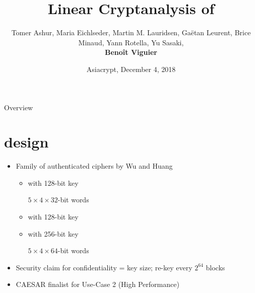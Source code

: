 \documentclass[aspectratio=169,10pt,webfont]{beamer}
\title{Linear Cryptanalysis of \MORUS}
\author{Tomer Ashur, Maria Eichlseder, Martin M. Lauridsen, Ga\"etan Leurent, Brice Minaud, Yann Rotella, Yu Sasaki,\\ \textbf{Beno\^it Viguier}}
\date[Short Occasion]{Asiacrypt, December 4, 2018}
\begin{document}
\begin{frame}
  \titlepage
\end{frame}


\begin{frame}{\itemwrap{\faMapSigns} Overview}
  \tableofcontents
\end{frame}

\section{\emph{\itemwrap{\faCogs}} \MORUS design}


\begin{frame}{\MORUS}

  \begin{itemize}
    \item Family of authenticated ciphers by Wu and Huang %
      \begin{itemize}
        \item \MORUS[640] with 128-bit key

          \hfill
          $5 \times 4 \times 32$-bit words
        \item \MORUS[1280-128] with 128-bit key
        \item \MORUS[1280-256] with 256-bit key

          \hfill
          $5 \times 4 \times 64$-bit words
      \end{itemize}
    \item Security claim for confidentiality = key size; re-key every $2^{64}$ blocks
    \item CAESAR finalist for Use-Case 2 (High Performance)
  \end{itemize}

\end{frame}
\end{document}
